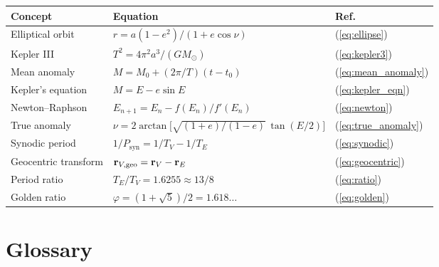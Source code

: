 \documentclass[11pt,letterpaper]{article}
\theoremstyle{definition}
\theoremstyle{plain}
\theoremstyle{remark}
\begin{document}
\begin{center}
\renewcommand{\arraystretch}{1.4}
\begin{tabular}{lll}
  \toprule
  \textbf{Concept} & \textbf{Equation} & \textbf{Ref.} \\
  \midrule
  Elliptical orbit     & $r = a(1-e^2)/(1+e\cos\nu)$
                       & (\ref{eq:ellipse}) \\
  Kepler III           & $T^2 = 4\pi^2 a^3 / (GM_\odot)$
                       & (\ref{eq:kepler3}) \\
  Mean anomaly         & $M = M_0 + (2\pi/T)(t-t_0)$
                       & (\ref{eq:mean_anomaly}) \\
  Kepler's equation    & $M = E - e\sin E$
                       & (\ref{eq:kepler_eqn}) \\
  Newton–Raphson       & $E_{n+1} = E_n - f(E_n)/f'(E_n)$
                       & (\ref{eq:newton}) \\
  True anomaly         & $\nu = 2\arctan\!\bigl[\sqrt{(1\!+\!e)/(1\!-\!e)}\,\tan(E/2)\bigr]$
                       & (\ref{eq:true_anomaly}) \\
  Synodic period       & $1/P_\text{syn} = 1/T_V - 1/T_E$
                       & (\ref{eq:synodic}) \\
  Geocentric transform & $\vb{r}_{V,\text{geo}} = \vb{r}_V - \vb{r}_E$
                       & (\ref{eq:geocentric}) \\
  Period ratio         & $T_E/T_V = 1.6255 \approx 13/8$
                       & (\ref{eq:ratio}) \\
  Golden ratio         & $\varphi = (1+\sqrt{5})/2 = 1.618\ldots$
                       & (\ref{eq:golden}) \\
  \bottomrule
\end{tabular}
\end{center}


\section{Glossary}
\label{sec:glossary}
\end{document}
